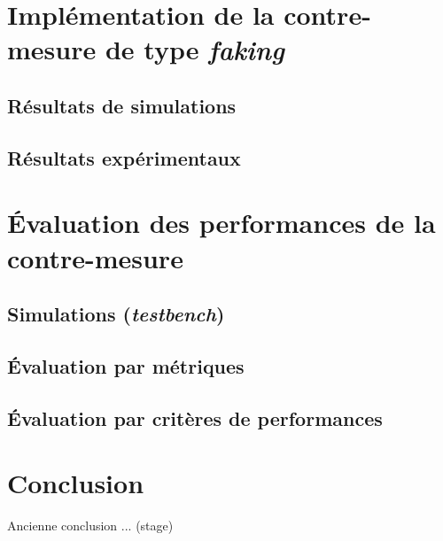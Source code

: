 \documentclass[oneside]{book}
\begin{document}
\newpage


\chapter{Implémentation de la contre-mesure de type \textit{faking}}
\label{chap:faking}

\section{Résultats de simulations}
\label{sec:Sim_results_Faking}

\section{Résultats expérimentaux}
\label{sec:Exp_Results_Faking}


\newpage


\chapter{Évaluation des performances de la contre-mesure}

\section{Simulations (\textit{testbench})}
\label{sec:EvalSim}

\section{Évaluation par métriques}
\label{sec:EvalMetrics}

\section{Évaluation par critères de performances}
\label{sec:EvalPerf}

\newpage


\chapter{Conclusion}

Ancienne conclusion ... (stage)
\end{document}
